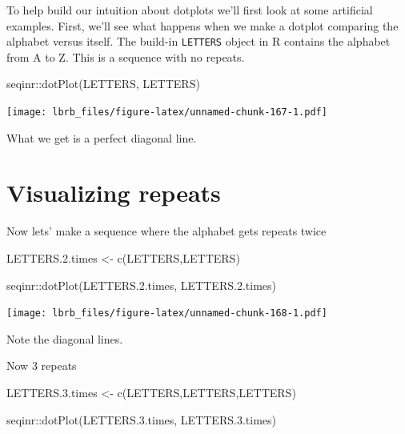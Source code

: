 \documentclass[
]{book}
\newenvironment{Shaded}{\begin{snugshade}}{\end{snugshade}}
\newcommand{\FloatTok}[1]{\textcolor[rgb]{0.00,0.00,0.81}{#1}}
\newcommand{\FunctionTok}[1]{\textcolor[rgb]{0.00,0.00,0.00}{#1}}
\newcommand{\NormalTok}[1]{#1}
\newcommand{\OtherTok}[1]{\textcolor[rgb]{0.56,0.35,0.01}{#1}}
\newcommand{\SpecialCharTok}[1]{\textcolor[rgb]{0.00,0.00,0.00}{#1}}
\begin{document}
To help build our intuition about dotplots we'll first look at some artificial examples. First, we'll see what happens when we make a dotplot comparing the alphabet versus itself. The build-in \texttt{LETTERS} object in R contains the alphabet from A to Z. This is a sequence with no repeats.

\begin{Shaded}
\begin{Highlighting}[]
\NormalTok{seqinr}\SpecialCharTok{::}\FunctionTok{dotPlot}\NormalTok{(LETTERS, }
\NormalTok{                LETTERS)}
\end{Highlighting}
\end{Shaded}

\texttt{[image: lbrb\_files/figure-latex/unnamed-chunk-167-1.pdf]}

What we get is a perfect diagonal line.

\hypertarget{visualizing-repeats}{%
\section{Visualizing repeats}\label{visualizing-repeats}}

Now lets' make a sequence where the alphabet gets repeats twice

\begin{Shaded}
\begin{Highlighting}[]
\NormalTok{LETTERS.}\FloatTok{2.}\NormalTok{times }\OtherTok{\textless{}{-}} \FunctionTok{c}\NormalTok{(LETTERS,LETTERS)}

\NormalTok{seqinr}\SpecialCharTok{::}\FunctionTok{dotPlot}\NormalTok{(LETTERS.}\FloatTok{2.}\NormalTok{times, }
\NormalTok{                LETTERS.}\FloatTok{2.}\NormalTok{times)}
\end{Highlighting}
\end{Shaded}

\texttt{[image: lbrb\_files/figure-latex/unnamed-chunk-168-1.pdf]}

Note the diagonal lines.

Now 3 repeats

\begin{Shaded}
\begin{Highlighting}[]
\NormalTok{LETTERS.}\FloatTok{3.}\NormalTok{times }\OtherTok{\textless{}{-}} \FunctionTok{c}\NormalTok{(LETTERS,LETTERS,LETTERS)}

\NormalTok{seqinr}\SpecialCharTok{::}\FunctionTok{dotPlot}\NormalTok{(LETTERS.}\FloatTok{3.}\NormalTok{times, }
\NormalTok{                LETTERS.}\FloatTok{3.}\NormalTok{times)}
\end{Highlighting}
\end{Shaded}
\end{document}
